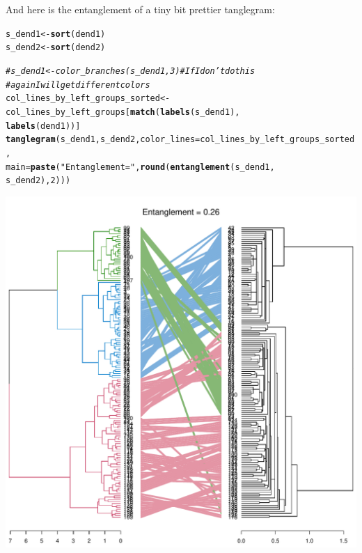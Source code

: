 \documentclass[shortnames,nojss,article]{jss}\usepackage[]{graphicx}\usepackage[]{color}
\makeatletter
\def\maxwidth{ %
  \ifdim\Gin@nat@width>\linewidth
    \linewidth
  \else
    \Gin@nat@width
  \fi
}
\newcommand{\hlnum}[1]{\textcolor[rgb]{0.686,0.059,0.569}{#1}}%
\newcommand{\hlstr}[1]{\textcolor[rgb]{0.192,0.494,0.8}{#1}}%
\newcommand{\hlcom}[1]{\textcolor[rgb]{0.678,0.584,0.686}{\textit{#1}}}%
\newcommand{\hlstd}[1]{\textcolor[rgb]{0.345,0.345,0.345}{#1}}%
\newcommand{\hlkwb}[1]{\textcolor[rgb]{0.69,0.353,0.396}{#1}}%
\newcommand{\hlkwc}[1]{\textcolor[rgb]{0.333,0.667,0.333}{#1}}%
\newcommand{\hlkwd}[1]{\textcolor[rgb]{0.737,0.353,0.396}{\textbf{#1}}}%
\newenvironment{kframe}{%
 \def\at@end@of@kframe{}%
 \ifinner\ifhmode%
  \def\at@end@of@kframe{\end{minipage}}%
  \begin{minipage}{\columnwidth}%
 \fi\fi%
 \def\FrameCommand##1{\hskip\@totalleftmargin \hskip-\fboxsep
 \colorbox{shadecolor}{##1}\hskip-\fboxsep
     \hskip-\linewidth \hskip-\@totalleftmargin \hskip\columnwidth}%
 \MakeFramed {\advance\hsize-\width
   \@totalleftmargin\z@ \linewidth\hsize
   \@setminipage}}%
 {\par\unskip\endMakeFramed%
 \at@end@of@kframe}
\newenvironment{knitrout}{}{} %
\makeatother
\begin{document}
And here is the entanglement of a tiny bit prettier tanglegram:

\begin{knitrout}
\color{fgcolor}\begin{kframe}
\begin{alltt}
\hlstd{s_dend1} \hlkwb{<-} \hlkwd{sort}\hlstd{(dend1)}
\hlstd{s_dend2} \hlkwb{<-} \hlkwd{sort}\hlstd{(dend2}\hlstd{)}

\hlcom{# s_dend1 <- color_branches(s_dend1, 3) # If I don't do this}
\hlcom{# again I will get different colors}
\hlstd{col_lines_by_left_groups_sorted} \hlkwb{<-} \hlstd{col_lines_by_left_groups[}\hlkwd{match}\hlstd{(}\hlkwd{labels}\hlstd{(s_dend1),}
    \hlkwd{labels}\hlstd{(dend1))]}
\hlkwd{tanglegram}\hlstd{(s_dend1, s_dend2,} \hlkwc{color_lines} \hlstd{= col_lines_by_left_groups_sorted,}
    \hlkwc{main} \hlstd{=} \hlkwd{paste}\hlstd{(}\hlstr{"Entanglement ="}\hlstd{,} \hlkwd{round}\hlstd{(}\hlkwd{entanglement}\hlstd{(s_dend1,}
        \hlstd{s_dend2),} \hlnum{2}\hlstd{)))}
\end{alltt}
\end{kframe}

{\centering \includegraphics[width=\maxwidth]{figure/unnamed-chunk-33} 

}



\end{knitrout}
\end{document}
